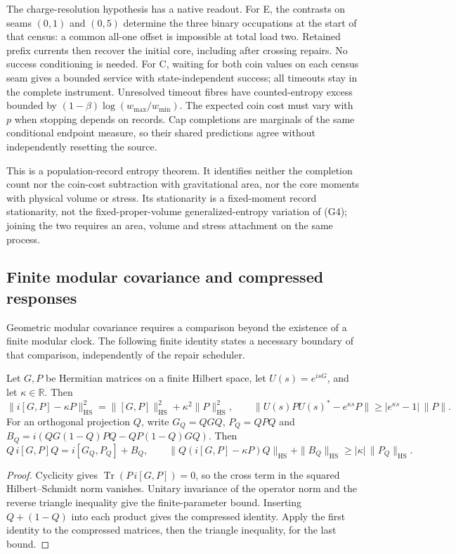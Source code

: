 \documentclass[11pt]{article}
\begin{document}
The charge-resolution hypothesis has a native readout. For E, the contrasts on
seams $(0,1)$ and $(0,5)$ determine the three binary occupations at the start
of that census: a common all-one offset is impossible at total load two.
Retained prefix currents then recover the initial core, including after
crossing repairs. No success conditioning is needed. For C, waiting for both
coin values on each census seam gives a bounded service with state-independent
success; all timeouts stay in the complete instrument. Unresolved timeout
fibres have counted-entropy excess bounded by
$(1-\beta)\log(w_{\max}/w_{\min})$. The expected coin cost must vary with $p$
when stopping depends on records. Cap completions are marginals of the same
conditional endpoint measure, so their shared predictions agree without
independently resetting the source.

This is a population-record entropy theorem. It identifies neither the
completion count nor the coin-cost subtraction with gravitational area, nor
the core moments with physical volume or stress. Its stationarity is a
fixed-moment record stationarity, not the fixed-proper-volume
generalized-entropy variation of (G4); joining the two requires an area,
volume and stress attachment on the same process.

\subsection{Finite modular covariance and compressed responses}
\label{sec:finite-modular-covariance}

Geometric modular covariance requires a comparison beyond the existence
of a finite modular clock. The following finite identity states a necessary
boundary of that comparison, independently of the repair scheduler.

\begin{proposition}
\label{prop:finite-modular-dilation}
Let $G,P$ be Hermitian matrices on a finite Hilbert space, let
$U(s)=e^{isG}$, and let $\kappa\in\mathbb R$. Then
\[
 \|i[G,P]-\kappa P\|_{\mathrm{HS}}^2
 =\|[G,P]\|_{\mathrm{HS}}^2+\kappa^2\|P\|_{\mathrm{HS}}^2,
 \qquad
 \|U(s)PU(s)^*-e^{\kappa s}P\|
 \geq |e^{\kappa s}-1|\,\|P\|.
\]
For an orthogonal projection $Q$, write $G_Q=QGQ$, $P_Q=QPQ$ and
$B_Q=i(QG(1-Q)PQ-QP(1-Q)GQ)$. Then
\[
 Q\,i[G,P]Q=i[G_Q,P_Q]+B_Q,
 \qquad
 \|Q(i[G,P]-\kappa P)Q\|_{\mathrm{HS}}+\|B_Q\|_{\mathrm{HS}}
 \geq |\kappa|\,\|P_Q\|_{\mathrm{HS}}.
\]
\end{proposition}
\begin{proof}
Cyclicity gives $\operatorname{Tr}(P\,i[G,P])=0$, so the cross term
in the squared Hilbert--Schmidt norm vanishes. Unitary invariance of
the operator norm and the reverse triangle inequality give the
finite-parameter bound. Inserting $Q+(1-Q)$ into each product gives
the compressed identity. Apply the first identity to the compressed
matrices, then the triangle inequality, for the last bound.
\end{proof}
\end{document}

